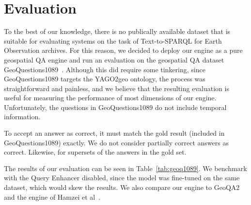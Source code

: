 \section{Evaluation}
\label{sec:eval}

To the best of our knowledge, there is no publically available dataset that is suitable for evaluating systems on the task of Text-to-SPARQL for Earth Observation archives. For this reason, we decided to deploy our engine as a pure geospatial QA engine and run an evaluation on the geospatial QA dataset GeoQuestions1089~\cite{geoquestions1089}. Although this did require some tinkering, since GeoQuestions1089 targets the YAGO2geo ontology, the process was straightforward and painless, and we believe that the resulting evaluation is useful for measuring the performance of most dimensions of our engine. Unfortunately, the questions in GeoQuestions1089 do not include temporal information.

To accept an answer as correct, it must match the gold result (included in GeoQuestions1089) exactly. We do not consider partially correct answers as correct. Likewise, for supersets of the answers in the gold set.

The results of our evaluation can be seen in Table~\ref{tab:geoq1089}. We benchmark \EngineName{} with the Query Enhancer disabled, since the model was fine-tuned on the same dataset, which would skew the results. We also compare our engine to GeoQA2 and the engine of Hamzei et al~\cite{hamzei}.


